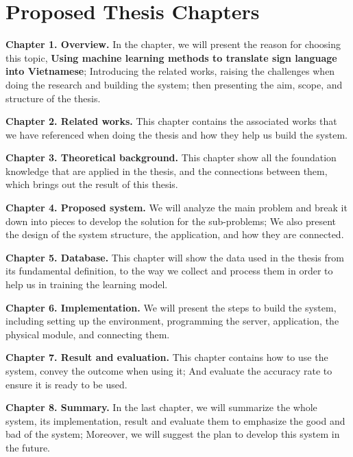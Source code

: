 \chapter{Proposed Thesis Chapters}

\textbf{Chapter 1. Overview.} In the chapter, we will present the reason for choosing this topic, \textbf{Using machine learning methods to translate sign language into Vietnamese}; Introducing the related works, raising the challenges when doing the research and building the system; then presenting the aim, scope, and structure of the thesis.

\textbf{Chapter 2. Related works.} This chapter contains the associated works that we have referenced when doing the thesis and how they help us build the system.

\textbf{Chapter 3. Theoretical background.} This chapter show all the foundation knowledge that are applied in the thesis, and the connections between them, which brings out the result of this thesis. 

\textbf{Chapter 4. Proposed system.} We will analyze the main problem and break it down into pieces to develop the solution for the sub-problems; We also present the design of the system structure, the application, and how they are connected.

\textbf{Chapter 5. Database.} This chapter will show the data used in the thesis from its fundamental definition, to the way we collect and process them in order to help us in training the learning model.

\textbf{Chapter 6. Implementation.} We will present the steps to build the system, including setting up the environment, programming the server, application, the physical module, and connecting them.

\textbf{Chapter 7. Result and evaluation.} This chapter contains how to use the system, convey the outcome when using it; And evaluate the accuracy rate to ensure it is ready to be used.

\textbf{Chapter 8. Summary.} In the last chapter, we will summarize the whole system, its implementation, result and evaluate them to emphasize the good and bad of the system; Moreover, we will suggest the plan to develop this system in the future.
